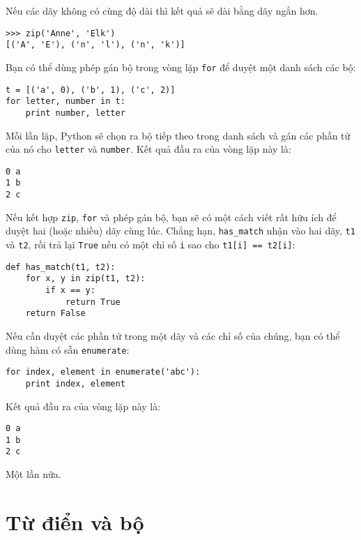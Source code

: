 \documentclass[11pt]{book}
\begin{document}

Nếu các dãy không có cùng độ dài thì kết quả sẽ dài bằng dãy ngắn hơn.

\beforeverb
\begin{verbatim}
>>> zip('Anne', 'Elk')
[('A', 'E'), ('n', 'l'), ('n', 'k')]
\end{verbatim}
\afterverb
%
Bạn có thể dùng phép gán bộ trong vòng lặp {\tt for} để duyệt một danh sách
các bộ:


\beforeverb
\begin{verbatim}
t = [('a', 0), ('b', 1), ('c', 2)]
for letter, number in t:
    print number, letter
\end{verbatim}
\afterverb
%
Mỗi lần lặp, Python sẽ chọn ra bộ tiếp theo trong danh sách và gán các
phần tử của nó cho {\tt letter} và {\tt number}. Kết quả đầu ra của vòng lặp
này là:


\beforeverb
\begin{verbatim}
0 a
1 b
2 c
\end{verbatim}
\afterverb
%
Nếu kết hợp {\tt zip}, {\tt for} và phép gán bộ, bạn sẽ có một
cách viết rất hữu ích để duyệt hai (hoặc nhiều) dãy cùng lúc. Chẳng hạn,
\verb"has_match" nhận vào hai dãy, {\tt t1} và
{\tt t2}, rồi trả lại {\tt True} nếu có một chỉ số {\tt i} 
sao cho {\tt t1[i] == t2[i]}:


\beforeverb
\begin{verbatim}
def has_match(t1, t2):
    for x, y in zip(t1, t2):
        if x == y:
            return True
    return False
\end{verbatim}
\afterverb
%
Nếu cần duyệt các phần tử trong một dãy và các chỉ số của chúng,
bạn có thể dùng hàm có sẵn {\tt enumerate}:


\beforeverb
\begin{verbatim}
for index, element in enumerate('abc'):
    print index, element
\end{verbatim}
\afterverb
%
Kết quả đầu ra của vòng lặp này là:

\beforeverb
\begin{verbatim}
0 a
1 b
2 c
\end{verbatim}
\afterverb
%
Một lần nữa.


\section{Từ điển và bộ}
\end{document}
